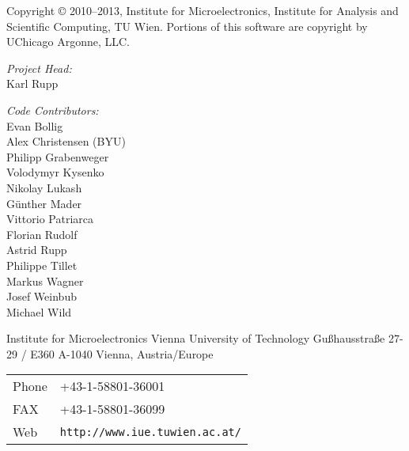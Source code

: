 
\clearpage

Copyright {\copyright} 2010--2013, Institute for Microelectronics,
                            Institute for Analysis and Scientific Computing,
                            TU Wien.
Portions of this software are copyright by UChicago Argonne, LLC.

\vspace{2.cm}

\textit{Project Head:}\\

Karl Rupp\\

\vspace{2.cm}

\textit{Code Contributors:} \\

Evan Bollig \\
Alex Christensen (BYU) \\
Philipp Grabenweger \\
Volodymyr Kysenko \\
Nikolay Lukash \\
G\"unther Mader \\
Vittorio Patriarca \\
Florian Rudolf \\
Astrid Rupp \\
Philippe Tillet \\
Markus Wagner \\
Josef Weinbub \\
Michael Wild \\



\vspace{4.0cm}

Institute for Microelectronics\newline
Vienna University of Technology\newline
Gu\ss hausstra\ss e 27-29 / E360\newline
A-1040 Vienna, Austria/Europe\newline


\begin{tabular}{ll}
Phone  & +43-1-58801-36001\\
FAX    & +43-1-58801-36099\\
Web    & \texttt{http://www.iue.tuwien.ac.at/}
\end{tabular}



